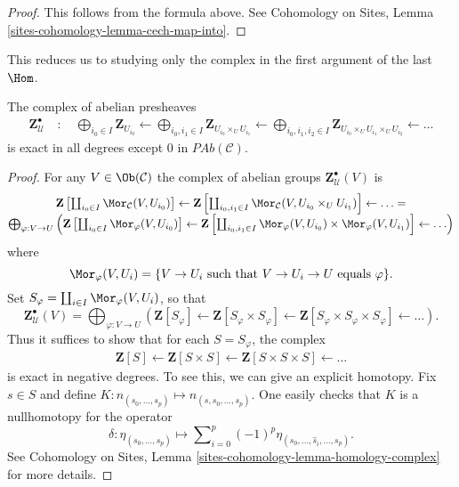 \begin{proof}
This follows from the formula above. See
Cohomology on Sites, Lemma \ref{sites-cohomology-lemma-cech-map-into}.
\end{proof}

\noindent
This reduces us to studying only the complex in the first argument of the
last $\Hom$.

\begin{lemma}
\label{lemma-exact}
The complex of abelian presheaves
\begin{align*}
\mathbf{Z}_\mathcal{U}^\bullet \quad : \quad
\bigoplus_{i_0 \in I} \mathbf{Z}_{U_{i_0}} \leftarrow
\bigoplus_{i_0, i_1 \in I} \mathbf{Z}_{U_{i_0} \times_U U_{i_1}} \leftarrow
\bigoplus_{i_0, i_1, i_2 \in I}
\mathbf{Z}_{U_{i_0} \times_U U_{i_1} \times_U U_{i_2}} \leftarrow
\ldots
\end{align*}
is exact in all degrees except $0$ in $\textit{PAb}(\mathcal{C})$.
\end{lemma}

\begin{proof}
For any $V\in \Ob(\mathcal{C})$ the complex of abelian groups
$\mathbf{Z}_\mathcal{U}^\bullet(V)$ is
$$
\begin{matrix}
\mathbf{Z}\left[
\coprod_{i_0\in I} \Mor_\mathcal{C}(V, U_{i_0})\right]
\leftarrow
\mathbf{Z}\left[
\coprod_{i_0, i_1 \in I}
\Mor_\mathcal{C}(V, U_{i_0} \times_U U_{i_1})\right]
\leftarrow \ldots = \\
\bigoplus_{\varphi : V \to U}
\left(
\mathbf{Z}\left[\coprod_{i_0 \in I} \Mor_\varphi(V, U_{i_0})\right]
\leftarrow
\mathbf{Z}\left[\coprod_{i_0, i_1\in I} \Mor_\varphi(V, U_{i_0}) \times
\Mor_\varphi(V, U_{i_1})\right]
\leftarrow
\ldots
\right)
\end{matrix}
$$
where
$$
\Mor_{\varphi}(V, U_i)
=
\{ V \to U_i \text{ such that } V \to U_i \to U \text{ equals } \varphi \}.
$$
Set $S_\varphi = \coprod_{i\in I} \Mor_\varphi(V, U_i)$, so that
$$
\mathbf{Z}_\mathcal{U}^\bullet(V)
=
\bigoplus_{\varphi : V \to U}
\left(
\mathbf{Z}[S_\varphi] \leftarrow
\mathbf{Z}[S_\varphi \times S_\varphi] \leftarrow
\mathbf{Z}[S_\varphi \times S_\varphi \times S_\varphi] \leftarrow
\ldots \right).
$$
Thus it suffices to show that for each $S = S_\varphi$, the complex
\begin{align*}
\mathbf{Z}[S] \leftarrow
\mathbf{Z}[S \times S] \leftarrow
\mathbf{Z}[S \times S \times S] \leftarrow \ldots
\end{align*}
is exact in negative degrees. To see this, we can give an explicit homotopy.
Fix $s\in S$ and define $K: n_{(s_0, \ldots, s_p)} \mapsto n_{(s, s_0,
\ldots, s_p)}.$ One easily checks that $K$ is a nullhomotopy for the operator
$$
\delta :
\eta_{(s_0, \ldots, s_p)}
\mapsto
\sum\nolimits_{i = 0}^p (-1)^p \eta_{(s_0, \ldots, \hat s_i, \ldots, s_p)}.
$$
See
Cohomology on Sites, Lemma \ref{sites-cohomology-lemma-homology-complex}
for more details.
\end{proof}

